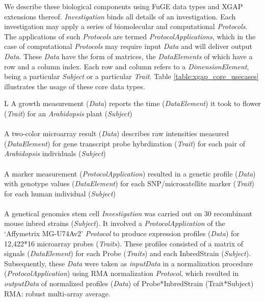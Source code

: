 We describe these biological components using FuGE data types and XGAP extensions thereof.
\textsl{Investigation} binds all details of an investigation.
Each investigation may apply a series of biomolecular\cite{Brown_2005} and computational\cite{Carey_2006, Alberts_2007, Fu_2007, Bhave_2007} \textsl{Protocols}.
The applications of such \textsl{Protocols} are termed \textsl{ProtocolApplications}, which in the case of computational \textsl{Protocols} may require input \textsl{Data} and will deliver output \textsl{Data}.
These \textsl{Data} have the form of matrices, the \textsl{DataElements} of which have a row and a column index.
Each row and column refers to a \textsl{DimensionElement}, being a particular \textsl{Subject} or a particular \textsl{Trait}.
Table \ref{table:xgap_core_usecases} illustrates the usage of these core data types.

\begin{table}
\begin{tabulary}{\linewidth}{L}
  \hline
  A growth measurement (\textsl{Data}) reports the time (\textsl{DataElement}) it took to flower (\textsl{Trait}) for an \textsl{Arabidopsis} plant (\textsl{Subject})\\
  ~\\
  A two-color microarray result (\textsl{Data}) describes raw intensities measured (\textsl{DataElement}) for gene transcript probe hybrdization (\textsl{Trait}) for each pair of \textsl{Arabidopsis} individuals (\textsl{Subject})\\
  ~\\
  A marker measurement (\textsl{ProtocolApplication}) resulted in a genetic profile (\textsl{Data}) with genotype values (\textsl{DataElement}) for each SNP/microsatellite marker (\textsl{Trait}) for each human individual (\textsl{Subject})\\
  ~\\
  A genetical genomics stem cell \textsl{Investigation} was carried out on 30 recombinant mouse inbred strains (\textsl{Subject}). It involved a \textsl{ProtocolApplication} of the ‘Affymetrix MG-U74Av2’ \textsl{Protocol} to produce expression profiles (\textsl{Data}) for 12,422*16 microarray probes (\textsl{Traits}). These profiles consisted of a matrix of signals (\textsl{DataElement}) for each Probe (\textsl{Traits}) and each InbredStrain (\textsl{Subject}). Subsequently, these \textsl{Data} were taken as \textsl{inputData} in a normalization procedure (\textsl{ProtocolApplication}) using RMA normalization \textsl{Protocol}, which resulted in \textsl{outputData} of normalized profiles (\textsl{Data}) of Probe*InbredStrain (Trait*Subject)\\
  \hline
  {\footnotesize RMA: robust multi-array average.}\\
\end{tabulary}
\caption{Use cases of core data types.}
\label{table:xgap_core_usecases}
\end{table}

